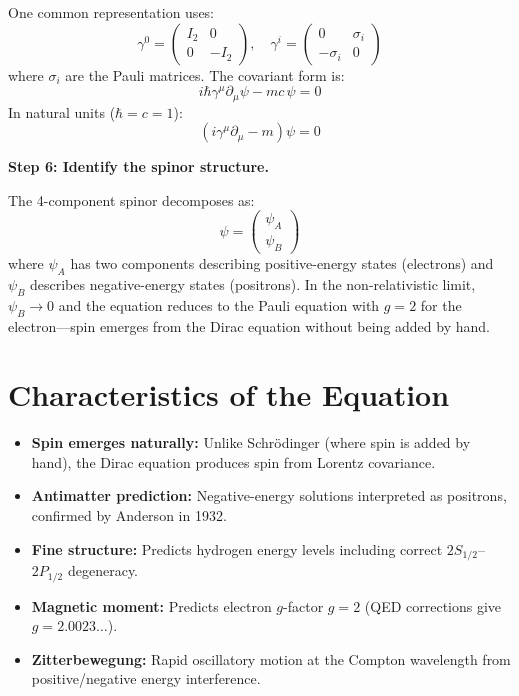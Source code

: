 \documentclass[11pt,openright]{book}
\begin{document}
One common representation uses:
\begin{equation}
\gamma^0 = \begin{pmatrix} I_2 & 0 \\ 0 & -I_2 \end{pmatrix}, \quad \gamma^i = \begin{pmatrix} 0 & \sigma_i \\ -\sigma_i & 0 \end{pmatrix}
\end{equation}
where $\sigma_i$ are the Pauli matrices. The covariant form is:
\begin{equation}
i\hbar\gamma^\mu\partial_\mu\psi - mc\,\psi = 0
\end{equation}
In natural units ($\hbar = c = 1$):
\begin{equation}
\boxed{(i\gamma^\mu\partial_\mu - m)\psi = 0}
\end{equation}

\textbf{Step 6: Identify the spinor structure.}

The 4-component spinor decomposes as:
\begin{equation}
\psi = \begin{pmatrix} \psi_A \\ \psi_B \end{pmatrix}
\end{equation}
where $\psi_A$ has two components describing positive-energy states (electrons) and $\psi_B$ describes negative-energy states (positrons). In the non-relativistic limit, $\psi_B \to 0$ and the equation reduces to the Pauli equation with $g = 2$ for the electron---spin emerges from the Dirac equation without being added by hand.

\section*{Characteristics of the Equation}

\begin{itemize}
\item \textbf{Spin emerges naturally:} Unlike Schr\"odinger (where spin is added by hand), the Dirac equation produces spin from Lorentz covariance.
\item \textbf{Antimatter prediction:} Negative-energy solutions interpreted as positrons, confirmed by Anderson in 1932.
\item \textbf{Fine structure:} Predicts hydrogen energy levels including correct $2S_{1/2}$--$2P_{1/2}$ degeneracy.
\item \textbf{Magnetic moment:} Predicts electron $g$-factor $g = 2$ (QED corrections give $g = 2.0023\ldots$).
\item \textbf{Zitterbewegung:} Rapid oscillatory motion at the Compton wavelength from positive/negative energy interference.
\end{itemize}
\end{document}
